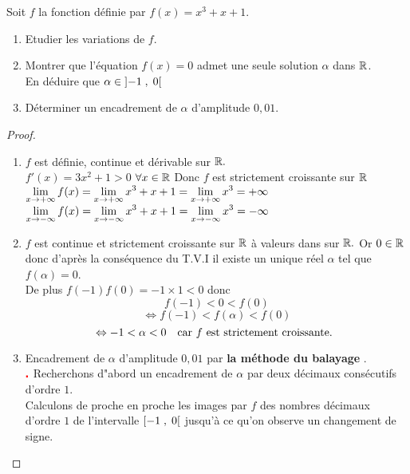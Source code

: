 \begin{exercice}
Soit $ f $ la fonction définie par $ f(x)= x^{3}+x+1 $.
 \begin{enumerate}
\item Etudier les variations  de $ f $.
\item Montrer que  l'équation $ f(x)=0 $ admet une seule solution $ \alpha$ dans $\mathbb{R} $.\\ En déduire que $ \alpha\in\left]-1 \;,\; 0\right[ $
\item  Déterminer un encadrement de $ \alpha $ d'amplitude $ 0,01 $.
\end{enumerate}
\end{exercice}
\begin{proof}
 \begin{enumerate}
\item $ f $ est définie, continue et dérivable sur $ \mathbb{R}. $\\
$ f'(x) = 3x^{2}+1 > 0$  $\forall x\in \mathbb{R} $ Donc $ f $ est strictement croissante  sur $ \mathbb{R} $ \\
$ \displaystyle\lim_{x \to +\infty}f(x)=\displaystyle \lim_{x \to +\infty}x^{3}+x+1=\displaystyle\lim_{x \to +\infty}x^{3}=+\infty$\\
$\displaystyle \lim_{x \to -\infty}f(x)=\displaystyle \lim_{x \to -\infty}x^{3}+x+1=\displaystyle\lim_{x \to -\infty}x^{3}=-\infty$



\item $ f $ est continue et strictement croissante sur $ \mathbb{R}$ à valeurs dans sur $ \mathbb{R}. $ Or $ 0\in \mathbb{R} $ donc d'après la conséquence  du T.V.I il existe un unique réel $ \alpha $ tel que $ f(\alpha)=0 $.\\ De plus $ f(-1)f(0)=-1\times 1 < 0$ donc $$  f(-1)<0<f(0) $$ $$ \Leftrightarrow f(-1)<f(\alpha)<f(0) $$ $$ \Leftrightarrow -1<\alpha< 0 \quad \textrm{car $ f $ est strictement croissante. }$$
\item Encadrement de $ \alpha $ d'amplitude $ 0,01 $ par \textbf{la méthode du balayage }.\\
$ \color{red}\centerdot $ Recherchons d"abord un encadrement de $ \alpha $ par deux décimaux consécutifs d'ordre $ 1. $\\
Calculons de proche en proche les images par $ f $  des nombres décimaux d'ordre $ 1 $ de l'intervalle $ \left[-1 \;,\; 0\right[ $ jusqu'à ce qu'on observe un changement de signe.



\end{enumerate}
\end{proof}
